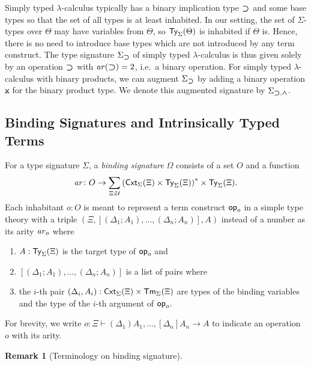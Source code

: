 \documentclass[acmsmall]{acmart}
\theoremstyle{acmdefinition}
\newtheorem{remark}[theorem]{Remark}}
\begin{document}
\begin{example}\label{ex:implication}
  Simply typed $\lambda$-calculus typically has a binary implication type $\mathbin{\bm{\supset}}$ and some base types so that the set of all types is at least inhabited.
  In our setting, the set of $\Sigma$-types over $\Theta$ may have variables from $\Theta$, so $\mathsf{Ty}_{\Sigma}(\Theta)$ is inhabited if $\Theta$ is.
  Hence, there is no need to introduce base types which are not introduced by any term construct.
  The type signature $\Sigma_{\mathbin{\bm{\supset}}}$ of simply typed $\lambda$-calculus is thus given solely by an operation $\mathbin{\bm{\supset}}$ with $\mathit{ar}(\mathbin{\bm{\supset}}) = 2$, i.e.\ a binary operation.
  For simply typed $\lambda$-calculus with binary products, we can augment
  $\Sigma_{\mathbin{\bm{\supset}}}$ by adding a binary operation $\btimes$ for the binary product type.
  We denote this augmented signature by $\Sigma_{\mathbin{\bm{\supset}}, \mathbin{\bm{\wedge}}}$.
  
\end{example}


\subsection{Binding Signatures and Intrinsically Typed Terms}
\begin{definition}\label{def:binding-signature}
  For a type signature $\Sigma$, a \emph{binding signature} $\Omega$ consists of a set $O$ and a function
  \[
    \mathit{ar}\colon O \to \sum_{\Xi : \mathcal{U}} \left(\mathsf{Cxt}_\Sigma(\Xi) \times \mathsf{Ty}_\Sigma(\Xi)\right)^* \times \mathsf{Ty}_\Sigma(\Xi).
  \]
  Each inhabitant $o: O$ is meant to represent a term construct $\mathsf{op}_o$ in a simple type theory with a triple $\left(\Xi, \left[\left(\Delta_1; A_1\right), \ldots, \left(\Delta_{n}; A_{n}\right) \right], A\right)$
  instead of a number as its arity $\mathit{ar}_o$ where
  \begin{enumerate}
    \item $A : \mathsf{Ty}_\Sigma(\Xi)$ is the target type of $\mathsf{op}_o$ and
    \item $\left[\left(\Delta_1; A_{1}\right), \ldots, \left(\Delta_{n}; A_{n}\right) \right]$ is a list of pairs where
    \item the $i$-th pair $(\Delta_i, A_i) :\mathsf{Cxt}_{\Sigma}(\Xi) \times \mathsf{Tm}_{\Sigma}(\Xi)$ are types of the binding variables and the type of the $i$-th argument of $\mathsf{op}_{o}$.
  \end{enumerate}
  For brevity, we write $o \colon \Xi \vdash (\Delta_1)A_{1}, \ldots, \left[\Delta_{n}\right] A_{n} \to A$ to indicate an operation $o$ with its arity. 
\end{definition}
\begin{remark}[Terminology on binding signature]
  \cite{Aczel1978,Fiore2010}
\end{remark}
\end{document}
